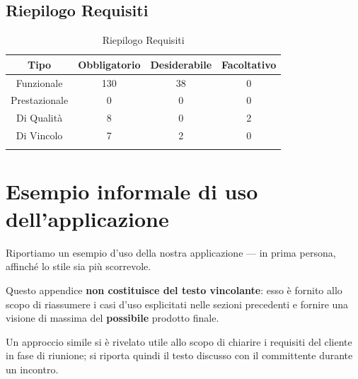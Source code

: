 \subsection{Riepilogo Requisiti}
\normalsize
\begin{longtable}{|c|c|c|c|}
\hline 
\textbf{Tipo} & \textbf{Obbligatorio} & \textbf{Desiderabile} & \textbf{Facoltativo}\\
\hline
Funzionale & 130 & 38 & 0\\ \hline
Prestazionale & 0 & 0 & 0\\ \hline
Di Qualità & 8 & 0 & 2\\ \hline
Di Vincolo & 7 & 2 & 0\\ \hline
\caption[Riepilogo Requisiti]{Riepilogo Requisiti}
\label{tabella:riepilogorequi}
\end{longtable}
\clearpage
\appendix
\section{Esempio informale di uso dell'applicazione }


Riportiamo un esempio d'uso della nostra applicazione --- in prima persona, affinché lo stile sia più scorrevole.

Questo appendice \textbf{non costituisce del testo vincolante}: esso è fornito allo scopo di riassumere i casi d'uso esplicitati nelle sezioni precedenti e fornire una visione di massima del \textbf{possibile} prodotto finale.

Un approccio simile si è rivelato utile allo scopo di chiarire i requisiti del cliente in fase di riunione; si riporta quindi il testo discusso con il committente durante un incontro.

